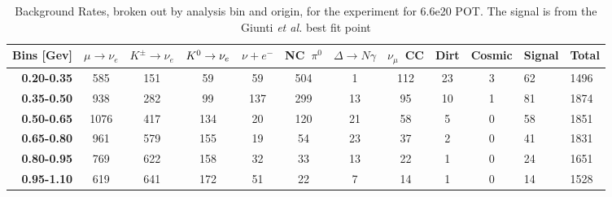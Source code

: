 \begin{table}[]
\centering
\small
\caption{Background Rates, broken out by analysis bin and origin, for the \icarus experiment for 6.6e20 POT. The signal is from the Giunti {\em et al.} best fit point}
\label{my-label}
\begin{tabular}{r|cccccccccll}
\multicolumn{1}{l|}{Bins [Gev]} & \multicolumn{1}{l}{$\mu\rightarrow\nu_e$} & \multicolumn{1}{l}{$K^{\pm}\rightarrow \nu_e$} & \multicolumn{1}{l}{$K^0 \rightarrow \nu_{e}$} & \multicolumn{1}{l}{$\nu + e^-$} & \multicolumn{1}{l}{NC~$\pi^0$} & \multicolumn{1}{l}{$\Delta \rightarrow N\gamma$} & \multicolumn{1}{l}{$\nu_{\mu}$~CC} & \multicolumn{1}{l}{Dirt} & \multicolumn{1}{l}{Cosmic} & Signal & Total \\ \hline
\textbf{0.20-0.35}        & 585                         & 151                         & 59                          & 59                       & 504                        & 1                          & 112                        & 23                       & 3                          & 62     & 1496  \\
\textbf{0.35-0.50}        & 938                         & 282                         & 99                          & 137                      & 299                        & 13                         & 95                         & 10                       & 1                          & 81     & 1874  \\
\textbf{0.50-0.65}        & 1076                        & 417                         & 134                         & 20                       & 120                        & 21                         & 58                         & 5                        & 0                          & 58     & 1851  \\
\textbf{0.65-0.80}        & 961                         & 579                         & 155                         & 19                       & 54                         & 23                         & 37                         & 2                        & 0                          & 41     & 1831  \\
\textbf{0.80-0.95}        & 769                         & 622                         & 158                         & 32                       & 33                         & 13                         & 22                         & 1                        & 0                          & 24     & 1651  \\
\textbf{0.95-1.10}        & 619                         & 641                         & 172                         & 51                       & 22                         & 7                          & 14                         & 1                        & 0                          & 14     & 1528  \\

\end{tabular}
\end{table}
